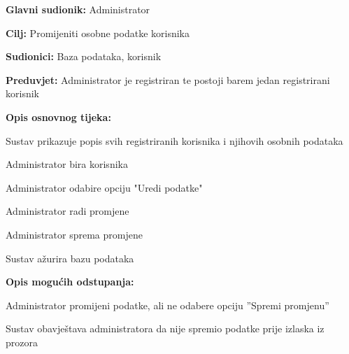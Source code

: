 					\noindent {}
					\begin{packed_item}
						
						\item \textbf{Glavni sudionik:} Administrator
						\item \textbf{Cilj:} Promijeniti osobne podatke korisnika
						\item \textbf{Sudionici:} Baza podataka, korisnik 
						\item \textbf{Preduvjet:} Administrator je registriran te postoji barem jedan registrirani korisnik
						\item \textbf{Opis osnovnog tijeka:}
						
						\item[] \begin{packed_enum}
							
							\item Sustav prikazuje popis svih registriranih korisnika i njihovih osobnih podataka
							\item Administrator bira korisnika
							\item Administrator odabire opciju "Uredi podatke"
							\item Administrator radi promjene
							\item Administrator sprema promjene 
							\item Sustav ažurira bazu podataka					
						\end{packed_enum}
						
						\item  \textbf{Opis mogućih odstupanja:}
						
						\item[] \begin{packed_item}
							
							\item[5.a] Administrator promijeni podatke, ali ne odabere opciju ”Spremi promjenu” 
							\item[] \begin{packed_enum}
								
								\item Sustav obavještava administratora da nije spremio podatke prije izlaska iz prozora
								
							\end{packed_enum}
							
						\end{packed_item}
					\end{packed_item}
					
